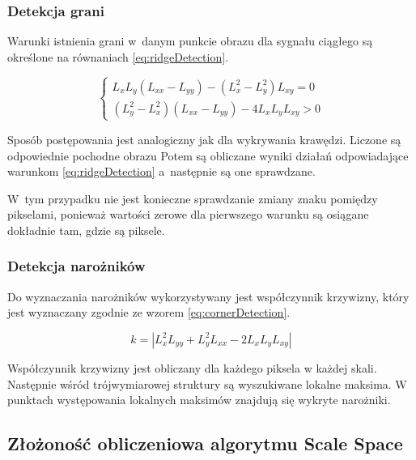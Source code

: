 \subsubsection{Detekcja grani}
\label{subsubsec:detekcjaGrani}

Warunki istnienia grani w~danym punkcie obrazu dla sygnału ciągłego są określone na równaniach \eqref{eq:ridgeDetection}.

\begin{equation}
\label{eq:ridgeDetection}
\left\{ \begin{array}{rl}
L_xL_y(L_{xx}-L_{yy}) - (L_x^2 - L_y^2)L_{xy} = 0 \\
(L_y^2 - L_x^2)(L_{xx} - L_{yy}) - 4 L_xL_yL_{xy} > 0
\end{array} \right.
\end{equation}

Sposób postępowania jest analogiczny jak dla wykrywania krawędzi. Liczone są odpowiednie pochodne obrazu
Potem są obliczane wyniki działań odpowiadające warunkom \eqref{eq:ridgeDetection} a~następnie są one sprawdzane.

W~tym przypadku nie jest konieczne sprawdzanie zmiany znaku pomiędzy pikselami, ponieważ wartości zerowe dla pierwszego warunku są osiągane dokładnie tam, gdzie są piksele. 

\subsubsection{Detekcja narożników}
\label{subsubsec:detekcjaNaroznikow}

Do wyznaczania narożników wykorzystywany jest współczynnik krzywizny, który jest wyznaczany zgodnie ze wzorem \eqref{eq:cornerDetection}.

\begin{equation}
\label{eq:cornerDetection}
k = |L_x^2L_{yy}  + L_y^2L_{xx} - 2L_xL_yL_{xy}|
\end{equation}

Współczynnik krzywizny jest obliczany dla każdego piksela w każdej skali. Następnie wśród trójwymiarowej struktury są wyszukiwane lokalne maksima. W punktach występowania lokalnych maksimów znajdują się wykryte narożniki.

\subsection{Złożoność obliczeniowa algorytmu Scale Space}
\label{subsec:zlozonosc_obliczeniowa}

